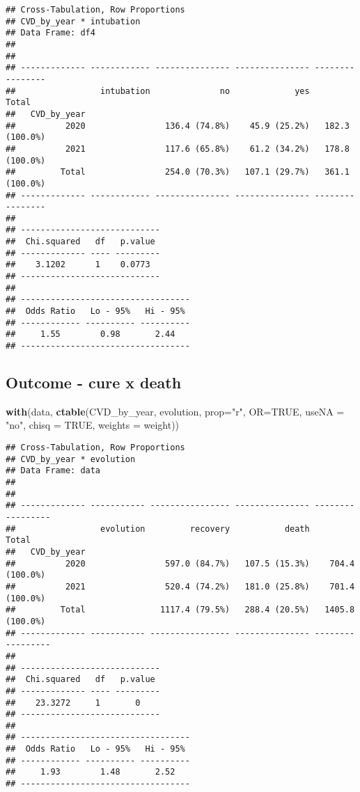 \documentclass[
]{article}
\newenvironment{Shaded}{\begin{snugshade}}{\end{snugshade}}
\newcommand{\AttributeTok}[1]{\textcolor[rgb]{0.13,0.29,0.53}{#1}}
\newcommand{\ConstantTok}[1]{\textcolor[rgb]{0.56,0.35,0.01}{#1}}
\newcommand{\FunctionTok}[1]{\textcolor[rgb]{0.13,0.29,0.53}{\textbf{#1}}}
\newcommand{\NormalTok}[1]{#1}
\newcommand{\StringTok}[1]{\textcolor[rgb]{0.31,0.60,0.02}{#1}}
\begin{document}
\begin{verbatim}
## Cross-Tabulation, Row Proportions  
## CVD_by_year * intubation  
## Data Frame: df4  
## 
## 
## ------------- ------------ --------------- --------------- ----------------
##                 intubation              no             yes            Total
##   CVD_by_year                                                              
##          2020                136.4 (74.8%)    45.9 (25.2%)   182.3 (100.0%)
##          2021                117.6 (65.8%)    61.2 (34.2%)   178.8 (100.0%)
##         Total                254.0 (70.3%)   107.1 (29.7%)   361.1 (100.0%)
## ------------- ------------ --------------- --------------- ----------------
## 
## ----------------------------
##  Chi.squared   df   p.value 
## ------------- ---- ---------
##    3.1202      1    0.0773  
## ----------------------------
## 
## ----------------------------------
##  Odds Ratio   Lo - 95%   Hi - 95% 
## ------------ ---------- ----------
##     1.55        0.98       2.44   
## ----------------------------------
\end{verbatim}

\hypertarget{outcome---cure-x-death}{%
\subsection{Outcome - cure x death}\label{outcome---cure-x-death}}

\begin{Shaded}
\begin{Highlighting}[]
\FunctionTok{with}\NormalTok{(data, }\FunctionTok{ctable}\NormalTok{(CVD\_by\_year, evolution, }\AttributeTok{prop=}\StringTok{"r"}\NormalTok{, }\AttributeTok{OR=}\ConstantTok{TRUE}\NormalTok{, }\AttributeTok{useNA =} \StringTok{"no"}\NormalTok{, }\AttributeTok{chisq =} \ConstantTok{TRUE}\NormalTok{, }\AttributeTok{weights =}\NormalTok{ weight))}
\end{Highlighting}
\end{Shaded}

\begin{verbatim}
## Cross-Tabulation, Row Proportions  
## CVD_by_year * evolution  
## Data Frame: data  
## 
## 
## ------------- ----------- ---------------- --------------- -----------------
##                 evolution         recovery           death             Total
##   CVD_by_year                                                               
##          2020                597.0 (84.7%)   107.5 (15.3%)    704.4 (100.0%)
##          2021                520.4 (74.2%)   181.0 (25.8%)    701.4 (100.0%)
##         Total               1117.4 (79.5%)   288.4 (20.5%)   1405.8 (100.0%)
## ------------- ----------- ---------------- --------------- -----------------
## 
## ----------------------------
##  Chi.squared   df   p.value 
## ------------- ---- ---------
##    23.3272     1       0    
## ----------------------------
## 
## ----------------------------------
##  Odds Ratio   Lo - 95%   Hi - 95% 
## ------------ ---------- ----------
##     1.93        1.48       2.52   
## ----------------------------------
\end{verbatim}
\end{document}
